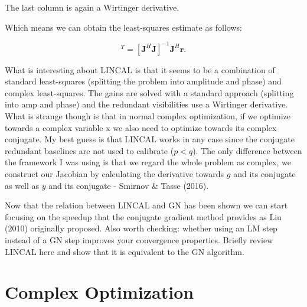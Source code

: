 \documentclass[a4paper,fleqn,usenatbib]{mnras}
\begin{document}
The last column is again a Wirtinger derivative.

Which means we can obtain the least-squares estimate as follows:

\begin{equation}
[\boldsymbol{\Delta \eta},\boldsymbol{\Delta \varphi},\boldsymbol{\Delta y}]^T = [\boldsymbol{J}^H\boldsymbol{J}]^{-1}\boldsymbol{J}^H\boldsymbol{r}.
\end{equation}

What is interesting about LINCAL is that it seems to be a combination of standard least-squares (splitting the problem into amplitude and phase) and 
complex least-squares. The gains are solved with a standard approach (splitting into amp and phase) and the redundant visibilities use a Wirtinger derivative. What is strange though is that in normal complex optimization, if we optimize towards a complex variable x we also need to optimize towards
its complex conjugate. My best guess is that LINCAL works in any case since the conjugate redundant baselines are not used to calibrate ($p<q$). The only difference between the framework I was using is that
we regard the whole problem as complex, we construct our Jacobian by calculating the derivative towards $g$ and its conjugate as well as $y$ and its conjugate - Smirnov \& Tasse (2016). 

Now that the relation between LINCAL and GN has been shown we can start focusing on the speedup that the conjugate gradient method provides as Liu (2010) originally proposed.
Also worth checking: whether using an LM step instead of a GN step improves your convergence properties.
Briefly review LINCAL here and show that it is equivalent to the GN algorithm.

\section{Complex Optimization}
\end{document}
